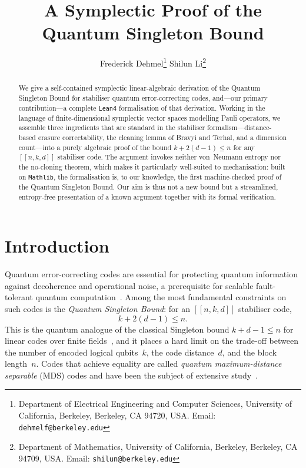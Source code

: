 \documentclass[11pt]{article}
\title{\textbf{A Symplectic Proof of the Quantum Singleton Bound}}
\author{Frederick Dehmel\thanks{Department of Electrical Engineering and Computer Sciences, University of California, Berkeley, Berkeley, CA 94720, USA. Email: \texttt{dehmelf@berkeley.edu}} \qquad Shilun Li\thanks{Department of Mathematics, University of California, Berkeley, Berkeley, CA 94709, USA. Email: \texttt{shilun@berkeley.edu}}}
\date{}
\theoremstyle{plain}
\theoremstyle{definition}
\begin{document}
\maketitle

\begin{abstract}
We give a self-contained symplectic linear-algebraic derivation of the Quantum Singleton Bound
for stabiliser quantum error-correcting codes, and---our primary contribution---a complete
\texttt{Lean4} formalisation of that derivation.  Working in the language of finite-dimensional
symplectic vector spaces modelling Pauli operators, we assemble three ingredients that are
standard in the stabiliser formalism---distance-based erasure correctability, the cleaning
lemma of Bravyi and Terhal, and a dimension count---into a purely algebraic proof of the bound
$k + 2(d-1) \le n$ for any $[[n,k,d]]$ stabiliser code.  The argument invokes neither
von~Neumann entropy nor the no-cloning theorem, which makes it particularly well-suited to
mechanisation: built on \texttt{Mathlib}, the formalisation is, to our knowledge, the first
machine-checked proof of the Quantum Singleton Bound.  Our aim is thus not a new bound but a
streamlined, entropy-free presentation of a known argument together with its formal
verification.
\end{abstract}
\newpage
\tableofcontents
\newpage
\section{Introduction}\label{sec:introduction}

Quantum error-correcting codes are essential for protecting quantum information against
decoherence and operational noise, a prerequisite for scalable fault-tolerant quantum
computation~\cite{KnillLaflamme1997,Gottesman1997,CalderbankShor1996,Steane1996}.  Among the
most fundamental constraints on such codes is the \emph{Quantum Singleton Bound}: for an
$[[n,k,d]]$ stabiliser code,
\[
  k + 2(d-1) \le n.
\]
This is the quantum analogue of the classical Singleton bound $k + d - 1 \le n$ for linear codes
over finite fields~\cite{Singleton1964,MacWilliamsSloane1977}, and it places a hard limit on
the trade-off between the number of encoded logical qubits~$k$, the code distance~$d$, and
the block length~$n$.  Codes that achieve equality are called \emph{quantum maximum-distance
separable} (MDS) codes and have been the subject of extensive
study~\cite{GrasslBeth1999,RainsMDS}.
\end{document}

